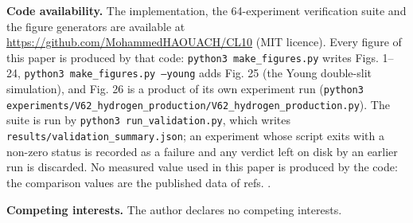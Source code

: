 \documentclass[aps,prd,amsmath,amssymb,superscriptaddress,longbibliography,floatfix,preprint]{revtex4-2}
\begin{document}
\textbf{Code availability.} The implementation, the 64-experiment verification suite and the figure generators are available at \url{https://github.com/MohammedHAOUACH/CL10} (MIT licence). Every figure of this paper is produced by that code: \texttt{python3 make\_\allowbreak{}figures.py} writes Figs. 1--24, \texttt{python3 make\_\allowbreak{}figures.py --young} adds Fig. 25 (the Young double-slit simulation), and Fig. 26 is a product of its own experiment run (\texttt{python3 experiments/\allowbreak{}V62\_\allowbreak{}hydrogen\_\allowbreak{}production/\allowbreak{}V62\_\allowbreak{}hydrogen\_\allowbreak{}production.py}). The suite is run by \texttt{python3 run\_\allowbreak{}validation.py}, which writes \texttt{results/\allowbreak{}validation\_\allowbreak{}summary.json}; an experiment whose script exits with a non-zero status is recorded as a failure and any verdict left on disk by an earlier run is discarded. No measured value used in this paper is produced by the code: the comparison values are the published data of refs. \cite{ref13,ref14,ref15,ref16,ref17}.

\textbf{Competing interests.} The author declares no competing interests.
\end{document}

